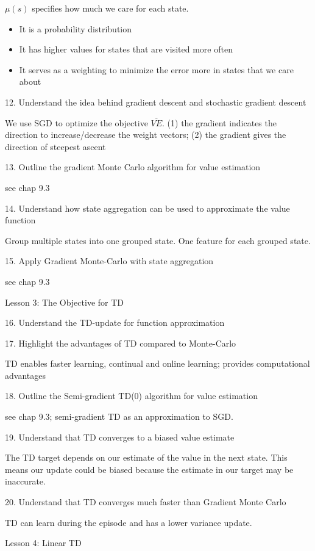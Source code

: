 \documentclass[sutton_barto_notes.tex]{subfiles}
\begin{document}
$\mu(s)$ specifies how much we care for each state.
\begin{itemize}
\item It is a probability distribution
\item It has higher values for states that are visited more often
\item It serves as a weighting to minimize the error more in states that we care about
\end{itemize}

12. Understand the idea behind gradient descent and stochastic gradient descent 

We use SGD to optimize the objective $\overline{VE}$. (1) the gradient indicates the direction to increase/decrease the weight vectors; (2) the gradient gives the direction of steepest ascent

13. Outline the gradient Monte Carlo algorithm for value estimation 

see chap 9.3

14. Understand how state aggregation can be used to approximate the value function 

Group multiple states into one grouped state. One feature for each grouped state.

15. Apply Gradient Monte-Carlo with state aggregation 

see chap 9.3

Lesson 3: The Objective for TD 

16. Understand the TD-update for function approximation 

17. Highlight the advantages of TD compared to Monte-Carlo 

TD enables faster learning, continual and online learning; provides computational advantages

18. Outline the Semi-gradient TD(0) algorithm for value estimation 


see chap 9.3; semi-gradient TD as an approximation to SGD.

19. Understand that TD converges to a biased value estimate 

The TD target depends on our estimate of the value in the next state. This means our update could be biased because the estimate in our target may be inaccurate.

20. Understand that TD converges much faster than Gradient Monte Carlo 

TD can learn during the episode and has a lower variance update.

Lesson 4: Linear TD 
\end{document}
